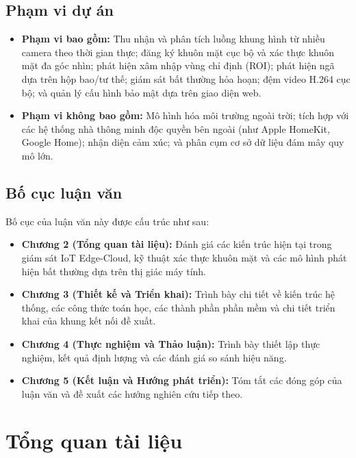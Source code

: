 \documentclass[12pt,a4paper]{article}
\begin{document}
\subsection{Phạm vi dự án}
\begin{itemize}
    \item \textbf{Phạm vi bao gồm:} Thu nhận và phân tích luồng khung hình từ nhiều camera theo thời gian thực; đăng ký khuôn mặt cục bộ và xác thực khuôn mặt đa góc nhìn; phát hiện xâm nhập vùng chỉ định (ROI); phát hiện ngã dựa trên hộp bao/tư thế; giám sát bất thường hỏa hoạn; đệm video H.264 cục bộ; và quản lý cấu hình bảo mật dựa trên giao diện web.
    \item \textbf{Phạm vi không bao gồm:} Mô hình hóa môi trường ngoài trời; tích hợp với các hệ thống nhà thông minh độc quyền bên ngoài (như Apple HomeKit, Google Home); nhận diện cảm xúc; và phân cụm cơ sở dữ liệu đám mây quy mô lớn.
\end{itemize}

\subsection{Bố cục luận văn}
Bố cục của luận văn này được cấu trúc như sau:
\begin{itemize}
    \item \textbf{Chương 2 (Tổng quan tài liệu):} Đánh giá các kiến trúc hiện tại trong giám sát IoT Edge-Cloud, kỹ thuật xác thực khuôn mặt và các mô hình phát hiện bất thường dựa trên thị giác máy tính.
    \item \textbf{Chương 3 (Thiết kế và Triển khai):} Trình bày chi tiết về kiến trúc hệ thống, các công thức toán học, các thành phần phần mềm và chi tiết triển khai của khung kết nối đề xuất.
    \item \textbf{Chương 4 (Thực nghiệm và Thảo luận):} Trình bày thiết lập thực nghiệm, kết quả định lượng và các đánh giá so sánh hiệu năng.
    \item \textbf{Chương 5 (Kết luận và Hướng phát triển):} Tóm tắt các đóng góp của luận văn và đề xuất các hướng nghiên cứu tiếp theo.
\end{itemize}

\newpage

\section{Tổng quan tài liệu}
\end{document}
